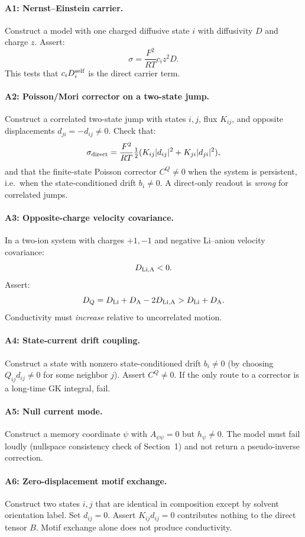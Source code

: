 \documentclass[11pt]{article}
\begin{document}
\paragraph{A1: Nernst--Einstein carrier.}
Construct a model with one charged diffusive state \(i\) with diffusivity
\(D\) and charge \(z\). Assert:
\[
\sigma
=
\frac{F^2}{RT}c_i z^2 D.
\]
This tests that \(c_i D_i^{\rm self}\) is the direct carrier term.

\paragraph{A2: Poisson/Mori corrector on a two-state jump.}
Construct a correlated two-state jump with states \(i,j\), flux \(K_{ij}\),
and opposite displacements \(d_{ji}=-d_{ij}\neq0\).
Check that:
\[
\sigma_{\rm direct}
=
\frac{F^2}{RT}\tfrac{1}{2}(K_{ij}|d_{ij}|^2+K_{ji}|d_{ji}|^2),
\]
and that the finite-state Poisson corrector \(C^Q\neq0\) when the system is
persistent, i.e.\ when the state-conditioned drift \(b_i\neq0\).
A direct-only readout is \emph{wrong} for correlated jumps.

\paragraph{A3: Opposite-charge velocity covariance.}
In a two-ion system with charges \(+1,-1\) and negative Li--anion velocity
covariance:
\[
D_{\rm Li,A}<0.
\]
Assert:
\[
D_Q = D_{\rm Li}+D_{\rm A}-2D_{\rm Li,A}>D_{\rm Li}+D_{\rm A}.
\]
Conductivity must \emph{increase} relative to uncorrelated motion.

\paragraph{A4: State-current drift coupling.}
Construct a state with nonzero state-conditioned drift \(b_i\neq0\) (by
choosing \(Q_{ij}d_{ij}\neq0\) for some neighbor \(j\)). Assert \(C^Q\neq0\).
If the only route to a corrector is a long-time GK integral, fail.

\paragraph{A5: Null current mode.}
Construct a memory coordinate \(\psi\) with \(A_{\psi\psi}=0\) but
\(h_\psi\neq0\). The model must fail loudly (nullspace consistency check
of Section~1) and not return a pseudo-inverse correction.

\paragraph{A6: Zero-displacement motif exchange.}
Construct two states \(i,j\) that are identical in composition except
by solvent orientation label. Set \(d_{ij}=0\). Assert \(K_{ij}d_{ij}=0\)
contributes nothing to the direct tensor \(B\). Motif exchange alone
does not produce conductivity.
\end{document}
